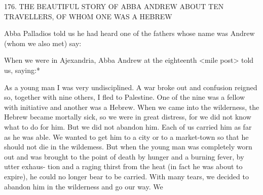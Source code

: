 176.
THE BEAUTIFUL STORY OF ABBA ANDREW
ABOUT TEN TRAVELLERS,
OF WHOM ONE WAS A HEBREW

Abba Palladios told us he had heard one of the fathers whose name
was Andrew (whom we also met) say:

When we were in Ajexandria, Abba Andrew at the eighteenth <mile
post> told us, saying:*

As a young man I was very undisciplined.
A war broke out and
confusion reigned so, together with nine others, I fled to Palestine.
One of the nine was a fellow with initiative and another was a
Hebrew.
When we came into the wilderness, the Hebrew became
mortally sick, so we were in great distress, for we did not know
what to do for him.
But we did not abandon him.
Each of us
carried him as far as he was able.
We wanted to get him to a city
or to a market-town so that he should not die in the wildemess.
But
when the young man was completely worn out and was brought to
the point of death by hunger and a burning fever, by utter exhaus-
tion and a raging thirst from the heat (in fact he was about to
expire), he could no longer bear to be carried.
With many tears, we
decided to abandon him in the wilderness and go our way.
We

